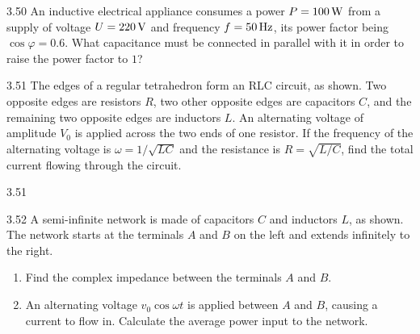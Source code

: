 \begin{problem}{3.50}
An inductive electrical appliance consumes a power $P=100\,\mathrm{W}$ from a supply of voltage $U=220\,\mathrm{V}$ and frequency $f=50\,\mathrm{Hz}$, its power factor being $\cos\varphi=0.6$. What capacitance must be connected in parallel with it in order to raise the power factor to $1$?
\end{problem}

\begin{problem}{3.51}
The edges of a regular tetrahedron form an RLC circuit, as shown. Two opposite edges are resistors $R$, two other opposite edges are capacitors $C$, and the remaining two opposite edges are inductors $L$. An alternating voltage of amplitude $V_0$ is applied across the two ends of one resistor. If the frequency of the alternating voltage is $\omega=1/\sqrt{LC}$ and the resistance is $R=\sqrt{L/C}$, find the total current flowing through the circuit.
\end{problem}

\begin{figbox}{3.51}
\end{figbox}

\begin{problem}{3.52}
A semi-infinite network is made of capacitors $C$ and inductors $L$, as shown. The network starts at the terminals $A$ and $B$ on the left and extends infinitely to the right.
\begin{enumerate}[label=(\arabic*),leftmargin=2.2em,itemsep=1pt,topsep=2pt]
\item Find the complex impedance between the terminals $A$ and $B$.
\item An alternating voltage $v_0\cos\omega t$ is applied between $A$ and $B$, causing a current to flow in. Calculate the average power input to the network.
\end{enumerate}
\end{problem}

